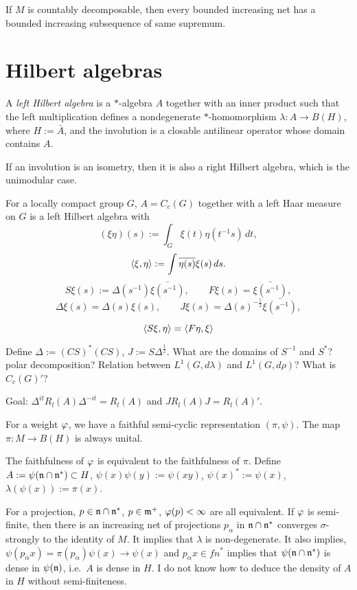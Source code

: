 \documentclass{../../large}
\begin{document}
If $M$ is countably decomposable, then every bounded increasing net has a bounded increasing subsequence of same supremum.





\section{Hilbert algebras}



\begin{prb}
A \emph{left Hilbert algebra} is a $*$-algebra $A$ together with an inner product such that the left multiplication defines a nondegenerate $*$-homomorphism $\lambda:A\to B(H)$, where $H:=\bar A$, and the involution is a closable antilinear operator whose domain contains $A$.

If an involution is an isometry, then it is also a right Hilbert algebra, which is the unimodular case.

\end{prb}

For a locally compact group $G$, $A=C_c(G)$ together with a left Haar measure on $G$ is a left Hilbert algebra with
\[(\xi\eta)(s):=\int_G\xi(t)\eta(t^{-1}s)\,dt,\]
\[\langle\xi,\eta\rangle:=\int\overline{\eta(s)}\xi(s)\,ds.\]
\[S\xi(s):=\Delta(s^{-1})\bar{\xi(s^{-1})},\qquad F\xi(s)=\bar{\xi(s^{-1})},\]
\[\Delta\xi(s)=\Delta(s)\xi(s),\qquad J\xi(s)=\Delta(s)^{-\frac12}\bar{\xi(s^{-1})},\]

\[\langle S\xi,\eta\rangle=\langle F\eta,\xi\rangle\]

Define $\Delta:=(CS)^*(CS)$, $J:=S\Delta^{\frac12}$.
What are the domains of $S^{-1}$ and $S^*$? polar decomposition?
Relation between $L^1(G,d\lambda)$ and $L^1(G,d\rho)$?
What is $C_c(G)'$?



Goal: $\Delta^{it}R_l(A)\Delta^{-it}=R_l(A)$ and $JR_l(A)J=R_l(A)'$.







For a weight $\varphi$, we have a faithful semi-cyclic representation $(\pi,\psi)$.
The map $\pi:M\to B(H)$ is always unital.

The faithfulness of $\varphi$ is equivalent to the faithfulness of $\pi$.
Define
$A:=\psi(\mathfrak{n}\cap\mathfrak{n}^*)\subset H$, $\psi(x)\psi(y):=\psi(xy)$, $\psi(x)^*:=\psi(x)$, $\lambda(\psi(x)):=\pi(x)$.

For a projection, $p\in\mathfrak{n}\cap\mathfrak{n}^*$, $p\in\mathfrak{m}^+$, $\varphi(p)<\infty$ are all equivalent.
If $\varphi$ is semi-finite, then there is an increasing net of projections $p_\alpha$ in $\mathfrak{n}\cap\mathfrak{n}^*$ converges $\sigma$-strongly to the identity of $M$.
It implies that $\lambda$ is non-degenerate.
It also implies, $\psi(p_\alpha x)=\pi(p_\alpha)\psi(x)\to\psi(x)$ and $p_\alpha x\in fn^*$ implies that $\psi(\mathfrak{n}\cap\mathfrak{n}^*)$ is dense in $\psi(\mathfrak{n})$, i.e.~$A$ is dense in $H$.
I do not know how to deduce the density of $A$ in $H$ without semi-finiteness.
\end{document}
